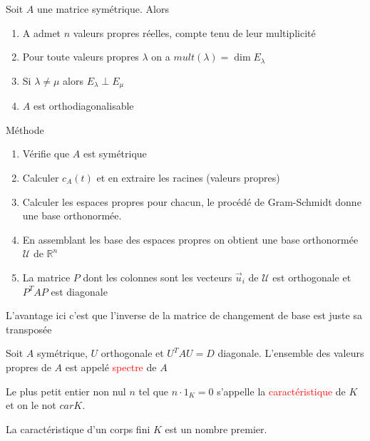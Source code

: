             \begin{theoreme}
                Soit $A$ une matrice symétrique. Alors
                \begin{enumerate}
                    \item A admet $n$ valeurs propres réelles, compte tenu de leur multiplicité
                    \item Pour toute valeurs propres $\lambda$ on a $mult(\lambda) = \dim E_\lambda$
                    \item Si $\lambda \neq \mu$ alors $E_\lambda \perp E_\mu$
                    \item $A$ est orthodiagonalisable
                \end{enumerate}
            \end{theoreme}
\begin{parag}{Méthode}
\begin{enumerate}
    \item Vérifie que $A$ est symétrique
    \item Calculer $c_A(t)$ et en extraire les racines (valeurs propres)
    \item Calculer les espaces propres pour chacun, le procédé de Gram-Schmidt donne une base orthonormée.
    \item En assemblant les base des espaces propres on obtient une base orthonormée $\mathcal{U}$ de $\mathbb{R}^n$
    \item La matrice $P$ dont les colonnes sont les vecteurs $\vec{u}_i$ de $\mathcal{U}$ est orthogonale et $P^TAP$ est diagonale
\end{enumerate}   
\begin{framedremark}
    L'avantage ici c'est que l'inverse de la matrice de changement de base est juste sa transposée
\end{framedremark}
\end{parag}
    \begin{definition}
        Soit $A$ symétrique, $U$ orthogonale et $U^TAU = D$ diagonale. L'ensemble des valeurs propres de $A$ est appelé \textcolor{red}{spectre} de $A$
    \end{definition}
    \begin{definition}
        Le plus petit entier non nul $n$ tel que $n\cdot 1_K = 0$ s'appelle la \textcolor{red}{caractéristique} de $K$ et on le not $carK$.
    \end{definition}
    \begin{theoreme}
        La caractéristique d'un corps fini $K$ est un nombre premier.
    \end{theoreme}
      

